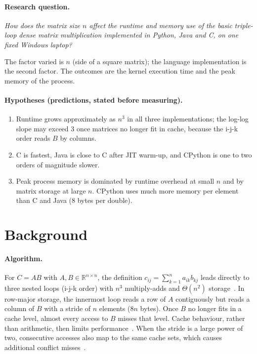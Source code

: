 \documentclass[11pt,a4paper]{article}
\begin{document}
\paragraph{Research question.}
\emph{How does the matrix size $n$ affect the runtime and memory use of the basic triple-loop dense
matrix multiplication implemented in Python, Java and C, on one fixed Windows laptop?}

The factor varied is $n$ (side of a square matrix); the language implementation is the second
factor. The outcomes are the kernel execution time and the peak memory of the process.

\paragraph{Hypotheses (predictions, stated before measuring).}
\begin{enumerate}
  \item[H1] Runtime grows approximately as $n^3$ in all three implementations; the log-log slope may
        exceed 3 once matrices no longer fit in cache, because the i-j-k order reads $B$ by columns.
  \item[H2] C is fastest, Java is close to C after JIT warm-up, and CPython is one to two orders of
        magnitude slower.
  \item[H3] Peak process memory is dominated by runtime overhead at small $n$ and by matrix storage at
        large $n$. CPython uses much more memory per element than C and Java (8 bytes per double).
\end{enumerate}

\section{Background}

\paragraph{Algorithm.} For $C = AB$ with $A, B \in \mathbb{R}^{n\times n}$, the definition
$c_{ij} = \sum_{k=1}^{n} a_{ik} b_{kj}$ leads directly to three nested loops
(i-j-k order) with $n^3$ multiply-adds and $\Theta(n^2)$ storage~\cite{golub2013}. In
row-major storage, the innermost loop reads a row of $A$ contiguously but reads a column of $B$
with a stride of $n$ elements ($8n$ bytes). Once $B$ no longer fits in a cache level,
almost every access to $B$ misses that level. Cache behaviour, rather than arithmetic, then limits
performance~\cite{drepper2007,hennessy2017}. When the stride is a large power of two, consecutive
accesses also map to the same cache sets, which causes additional conflict
misses~\cite{lam1991}.
\end{document}
